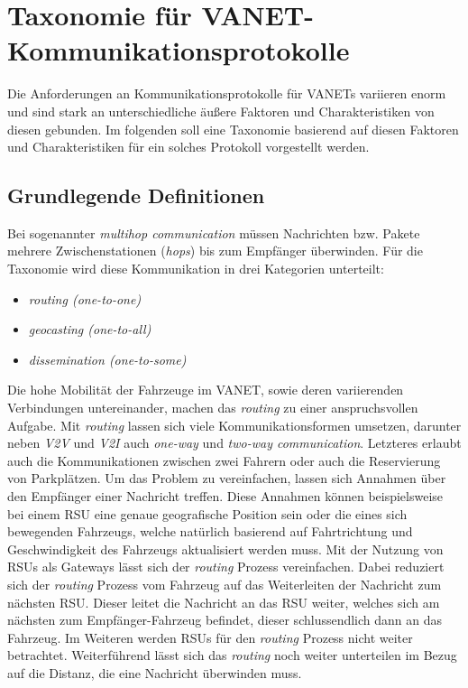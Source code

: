 \documentclass[english,runningheads,a4paper]{llncs}[2018/03/10]
\begin{document}
\section{Taxonomie für VANET-Kommunikationsprotokolle}
\label{sec:taxcommunicationprotocol}
Die Anforderungen an Kommunikationsprotokolle für VANETs variieren enorm und sind stark an unterschiedliche äußere Faktoren und Charakteristiken von diesen gebunden.
Im folgenden soll eine Taxonomie basierend auf diesen Faktoren und Charakteristiken für ein solches Protokoll vorgestellt werden.

\subsection{Grundlegende Definitionen}
Bei sogenannter \textit{multihop communication} müssen Nachrichten bzw. Pakete mehrere Zwischenstationen (\textit{hops}) bis zum Empfänger überwinden.
Für die Taxonomie wird diese Kommunikation in drei Kategorien unterteilt:
\begin{itemize}
  \item \textit{routing (one-to-one)}
  \item \textit{geocasting (one-to-all)}
  \item \textit{dissemination (one-to-some)}
\end{itemize}
Die hohe Mobilität der Fahrzeuge im VANET, sowie deren variierenden Verbindungen untereinander, machen das \textit{routing} zu einer anspruchsvollen Aufgabe.
Mit \textit{routing} lassen sich viele Kommunikationsformen umsetzen, darunter neben \textit{V2V} und \textit{V2I} auch \textit{one-way} und \textit{two-way communication}.
Letzteres erlaubt auch die Kommunikationen zwischen zwei Fahrern oder auch die Reservierung von Parkplätzen.
Um das Problem zu vereinfachen, lassen sich Annahmen über den Empfänger einer Nachricht treffen.
Diese Annahmen können beispielsweise bei einem RSU eine genaue geografische Position sein oder die eines sich bewegenden Fahrzeugs, welche natürlich basierend auf Fahrtrichtung und Geschwindigkeit des Fahrzeugs aktualisiert werden muss.
Mit der Nutzung von RSUs als Gateways lässt sich der \textit{routing} Prozess vereinfachen.
Dabei reduziert sich der \textit{routing} Prozess vom Fahrzeug auf das Weiterleiten der Nachricht zum nächsten RSU\@.
Dieser leitet die Nachricht an das RSU weiter, welches sich am nächsten zum Empfänger-Fahrzeug befindet, dieser schlussendlich dann an das Fahrzeug.
Im Weiteren werden RSUs für den \textit{routing} Prozess nicht weiter betrachtet.
Weiterführend lässt sich das \textit{routing} noch weiter unterteilen im Bezug auf die Distanz, die eine Nachricht überwinden muss.
\end{document}
